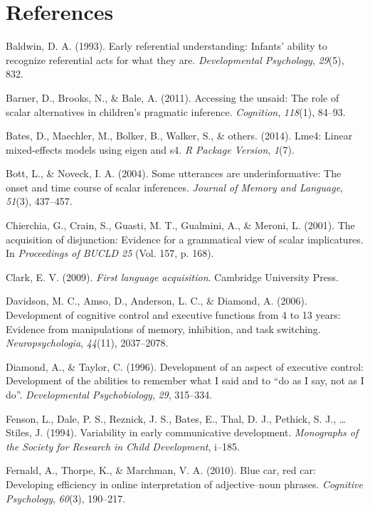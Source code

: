 \documentclass[a4paper,man,apacite,floatsintext]{apa6}
\begin{document}
\newpage

\section*{References}\label{references}

Baldwin, D. A. (1993). Early referential understanding: Infants' ability
to recognize referential acts for what they are. \emph{Developmental
Psychology}, \emph{29}(5), 832.

Barner, D., Brooks, N., \& Bale, A. (2011). Accessing the unsaid: The
role of scalar alternatives in children's pragmatic inference.
\emph{Cognition}, \emph{118}(1), 84--93.

Bates, D., Maechler, M., Bolker, B., Walker, S., \& others. (2014).
Lme4: Linear mixed-effects models using eigen and s4. \emph{R Package
Version}, \emph{1}(7).

Bott, L., \& Noveck, I. A. (2004). Some utterances are underinformative:
The onset and time course of scalar inferences. \emph{Journal of Memory
and Language}, \emph{51}(3), 437--457.

Chierchia, G., Crain, S., Guasti, M. T., Gualmini, A., \& Meroni, L.
(2001). The acquisition of disjunction: Evidence for a grammatical view
of scalar implicatures. In \emph{Proceedings of BUCLD 25} (Vol. 157, p.
168).

Clark, E. V. (2009). \emph{First language acquisition}. Cambridge
University Press.

Davidson, M. C., Amso, D., Anderson, L. C., \& Diamond, A. (2006).
Development of cognitive control and executive functions from 4 to 13
years: Evidence from manipulations of memory, inhibition, and task
switching. \emph{Neuropsychologia}, \emph{44}(11), 2037--2078.

Diamond, A., \& Taylor, C. (1996). Development of an aspect of executive
control: Development of the abilities to remember what I said and to
``do as I say, not as I do''. \emph{Developmental Psychobiology},
\emph{29}, 315--334.

Fenson, L., Dale, P. S., Reznick, J. S., Bates, E., Thal, D. J.,
Pethick, S. J., \ldots{} Stiles, J. (1994). Variability in early
communicative development. \emph{Monographs of the Society for Research
in Child Development}, i--185.

Fernald, A., Thorpe, K., \& Marchman, V. A. (2010). Blue car, red car:
Developing efficiency in online interpretation of adjective--noun
phrases. \emph{Cognitive Psychology}, \emph{60}(3), 190--217.
\end{document}
